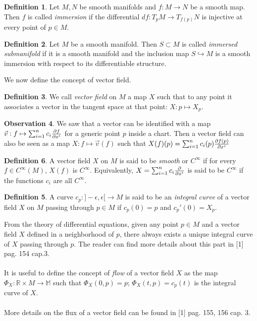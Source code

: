 \documentclass[12pt,a4paper]{report}
\theoremstyle{definition}
\newtheorem{Def}{Definition}[chapter]
\theoremstyle{Theorem}
\theoremstyle{definition}
\theoremstyle{definition}
\newtheorem{Obs}[Def]{Observation}
\begin{document}
	\begin{Def}
		Let $M,N$ be smooth manifolds and $f:M\rightarrow N$ be a smooth map. Then $f$ is called \textit{immersion} if the differential $df:T_pM\rightarrow T_{f(p)}N$ is injective at every point of $p\in M$.
	\end{Def}
	\begin{Def}
		Let $M$ be a smooth manifold. Then $S\subset M$ is called \textit{immersed submanifold} if it is a smooth manifold and the inclusion map $S\hookrightarrow M$ is a smooth immersion with respect to its differentiable structure. 
	\end{Def}
	We now define the concept of vector field.
	\begin{Def}
		We call \textit{vector field} on $M$ a map $X$ such that to any point it associates a vector in the tangent space at that point: $X:p\mapsto X_p$. 
	\end{Def}
	\begin{Obs}
		We saw that a vector can be identified with a map $\vec{v}:f\mapsto\sum_{i=1}^{n}c_i{\partial f\over \partial x^i}$ for a generic point $p$ inside a chart. Then a vector field can also be seen as a map $X:f\mapsto\vec{v}(f)$ such that $X(f)(p)=\sum_{i=1}^{n}c_i(p){\partial f(p)\over \partial x^i}$
	\end{Obs}
	\begin{Def}
		A vector field $X$ on $M$ is said to be \textit{smooth} or $C^\infty$ if for every $f\in C^\infty(M)$, $X(f)$ is $C^\infty$. Equivalently, $X=\sum_{i=1}^{n}c_i{\partial\over \partial x^i}$ is said to be $C^\infty$ if the functions $c_i$ are all $C^\infty$.
		\begin{Def}
			A curve $c_p:]-\epsilon,\epsilon[\rightarrow M$ is said to be an \textit{integral curve} of a vector field $X$ on $M$ passing through $p\in M$ if $c_p(0)=p$ and $c_p'(0)=X_p$.
		\end{Def}
		From the theory of differential equations, given any point $p\in M$ and a vector field $X$ defined in a neighborhood of $p$, there always exists a unique integral curve of $X$ passing through $p$. The reader can find more details about this part in [1] pag. 154 cap.3.\\
		\\
		It is useful to define the concept of \textit{flow} of a vector field $X$ as the map $\Phi_X:\mathbb{R}\times M\rightarrow\mathbb{M}$ such that $\Phi_X(0,p)=p$; $\Phi_X(t,p)=c_p(t)$ is the integral curve of $X$.\\
		\\
		More details on the flux of a vector field can be found in [1] pag. 155, 156 cap. 3.
	\end{Def}
\end{document}
